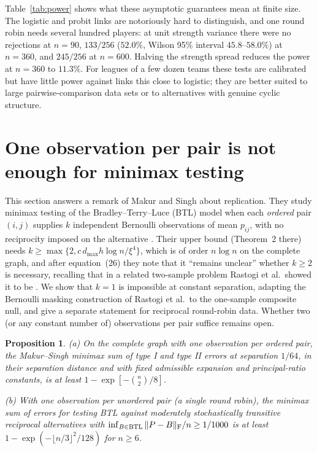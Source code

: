 \documentclass[11pt,a4paper]{article}
\newtheorem{proposition}[theorem]{Proposition}
\theoremstyle{definition}
\begin{document}
Table~\ref{tab:power} shows what these asymptotic guarantees mean at finite size. The logistic and probit links are notoriously hard to distinguish, and one round robin needs several hundred players: at unit strength variance there were no rejections at $n=90$, $133/256$ ($52.0\%$, Wilson 95\% interval $45.8$--$58.0\%$) at $n=360$, and $245/256$ at $n=600$. Halving the strength spread reduces the power at $n=360$ to $11.3\%$. For leagues of a few dozen teams these tests are calibrated but have little power against links this close to logistic; they are better suited to large pairwise-comparison data sets or to alternatives with genuine cyclic structure.

\section{One observation per pair is not enough for minimax testing}\label{sec:onerep}

This section answers a remark of Makur and Singh about replication. They study minimax testing of the Bradley--Terry--Luce (BTL) model when each \emph{ordered} pair $(i,j)$ supplies $k$ independent Bernoulli observations of mean $p_{ij}$, with no reciprocity imposed on the alternative \cite{MS2025}. Their upper bound (Theorem~2 there) needs $k\ge\max\{2,c\,d_{\max}h\log n/\xi^4\}$, which is of order $n\log n$ on the complete graph, and after equation~(26) they note that it ``remains unclear'' whether $k\ge2$ is necessary, recalling that in a related two-sample problem Rastogi et al.\ showed it to be \cite[Proposition~4]{RBSS2022}. We show that $k=1$ is impossible at constant separation, adapting the Bernoulli masking construction of Rastogi et al.\ to the one-sample composite null, and give a separate statement for reciprocal round-robin data. Whether two (or any constant number of) observations per pair suffice remains open.

\begin{proposition}\label{thm:one-rep}
(a) On the complete graph with one observation per ordered pair, the Makur--Singh minimax sum of type I and type II errors at separation $1/64$, in their separation distance and with fixed admissible expansion and principal-ratio constants, is at least $1-\exp[-\binom n2/8]$.

(b) With one observation per unordered pair (a single round robin), the minimax sum of errors for testing BTL against moderately stochastically transitive reciprocal alternatives with $\inf_{B\in\mathrm{BTL}}\|P-B\|_{\rm F}/n\ge 1/1000$ is at least $1-\exp(-\lfloor n/3\rfloor^2/128)$ for $n\ge6$.
\end{proposition}
\end{document}
